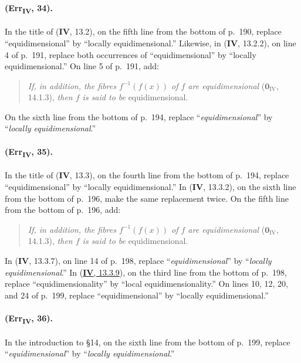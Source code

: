 {\paragraph{(Err\textsubscript{\textmd{IV}}, 34).}
In the title of (\textbf{IV}, 13.2), on the fifth line from the bottom of p.~190,
replace ``equidimensional'' by ``locally equidimensional.''  Likewise,
in (\textbf{IV}, 13.2.2), on line 4 of p.~191, replace both occurrences of
``equidimensional'' by ``locally equidimensional.''
On line 5 of
p.~191, add:
\begin{quote}
\emph{If, in addition, the fibres $f^{-1}(f(x))$ of $f$ are equidimensional}
($\mathbf{0}_{\mathrm{IV}}$, 14.1.3), \emph{then $f$ is said to be}
equidimensional.
\end{quote}
On the sixth line from the bottom of p.~194, replace
``\emph{equidimensional}'' by ``\emph{locally equidimensional}.''

\paragraph{(Err\textsubscript{\textmd{IV}}, 35).}
In the title of (\textbf{IV}, 13.3), on the fourth line from the bottom of p.~194,
replace ``equidimensional'' by ``locally equidimensional.''  In
(\textbf{IV}, 13.3.2), on the sixth line from the bottom of p.~196, make the same
replacement twice.  On the fifth line from the bottom of p.~196, add:
\begin{quote}
\emph{If, in addition, the fibres $f^{-1}(f(x))$ of $f$ are equidimensional}
($\mathbf{0}_{\mathrm{IV}}$, 14.1.3), \emph{then $f$ is said to be}
equidimensional.
\end{quote}
In (\textbf{IV}, 13.3.7), on line 14 of p.~198, replace ``\emph{equidimensional}'' by
``\emph{locally equidimensional}.''  In ({\hyperref[IV.13.3.9]{\textbf{IV}, 13.3.9}}), on the third line from
the bottom of p.~198, replace ``equidimensionality'' by ``local
equidimensionality.''  On lines 10, 12, 20, and 24 of p.~199, replace
``equidimensional'' by ``locally equidimensional.''

\paragraph{(Err\textsubscript{\textmd{IV}}, 36).}
In the introduction to \S14, on the sixth line from the bottom of
p.~199, replace ``\emph{equidimensional}'' by ``\emph{locally equidimensional}.''

}
